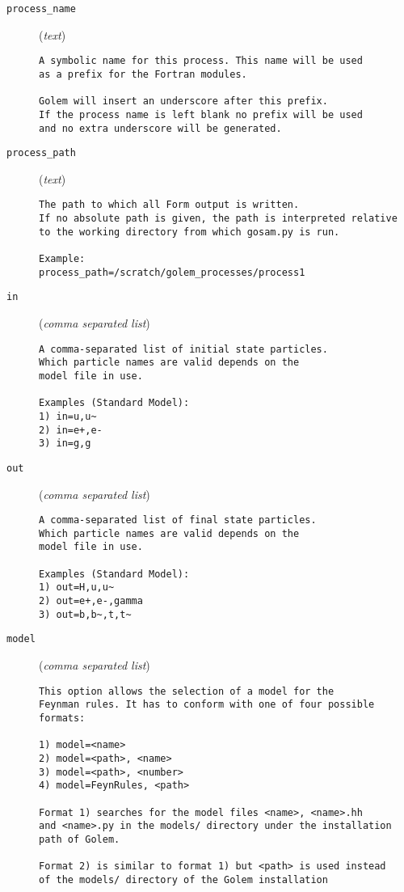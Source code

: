 \begin{description}
\item[\texttt{process\_name}] (\textit{text})
\begin{verbatim}
A symbolic name for this process. This name will be used
as a prefix for the Fortran modules.

Golem will insert an underscore after this prefix.
If the process name is left blank no prefix will be used
and no extra underscore will be generated.
\end{verbatim}
\item[\texttt{process\_path}] (\textit{text})
\begin{verbatim}
The path to which all Form output is written.
If no absolute path is given, the path is interpreted relative
to the working directory from which gosam.py is run.

Example:
process_path=/scratch/golem_processes/process1
\end{verbatim}
\item[\texttt{in}] (\textit{comma separated list})
\begin{verbatim}
A comma-separated list of initial state particles.
Which particle names are valid depends on the
model file in use.

Examples (Standard Model):
1) in=u,u~
2) in=e+,e-
3) in=g,g
\end{verbatim}
\item[\texttt{out}] (\textit{comma separated list})
\begin{verbatim}
A comma-separated list of final state particles.
Which particle names are valid depends on the
model file in use.

Examples (Standard Model):
1) out=H,u,u~
2) out=e+,e-,gamma
3) out=b,b~,t,t~
\end{verbatim}
\item[\texttt{model}] (\textit{comma separated list})
\begin{verbatim}
This option allows the selection of a model for the
Feynman rules. It has to conform with one of four possible
formats:

1) model=<name>
2) model=<path>, <name>
3) model=<path>, <number>
4) model=FeynRules, <path>

Format 1) searches for the model files <name>, <name>.hh
and <name>.py in the models/ directory under the installation
path of Golem.

Format 2) is similar to format 1) but <path> is used instead
of the models/ directory of the Golem installation


\end{verbatim}
\end{description}

